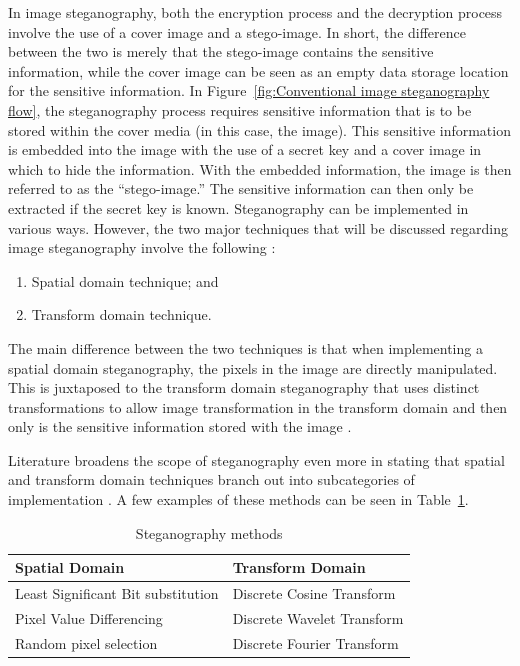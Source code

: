 In image steganography, both the encryption process and the decryption process involve the use of a cover image and a stego-image. In short, the difference between the two is merely that the stego-image contains the sensitive information, while the cover image can be seen as an empty data storage location for the sensitive information. In Figure~\ref{fig:Conventional image steganography flow}, the steganography process requires sensitive information that is to be stored within the cover media (in this case, the image). This sensitive information is embedded into the image with the use of a secret key and a cover image in which to hide the information. With the embedded information, the image is then referred to as the “stego-image.” The sensitive information can then only be extracted if the secret key is known.
\pagebreak
Steganography can be implemented in various ways. However, the two major techniques that will be discussed regarding image steganography involve the following \citep{Pradhan2016, Paul2012}:

\begin{enumerate}[label=\roman*.]
	\item Spatial domain technique; and 
	\item Transform domain technique.
\end{enumerate}

The main difference between the two techniques is that when implementing a spatial domain steganography, the pixels in the image are directly manipulated. This is juxtaposed to the transform domain steganography that uses distinct transformations to allow image transformation in the transform domain and then only is the sensitive information stored with the image \citep{Pradhan2016, Roy2016}.

Literature broadens the scope of steganography even more in stating that spatial and transform domain techniques branch out into subcategories of implementation \citep{Radha2011, SyedAhmad2012, Verma2016}. A few examples of these methods can be seen in Table~\ref{table: Steganography methods}.

\begin{table}[h]
\caption{Steganography methods}
\centering
 \begin{tabular}{|p{} | p{}|} 
 \hline
	\textbf{Spatial Domain} & \textbf{Transform Domain} \\ [1ex] 
 \hline\hline 
 Least Significant Bit substitution & Discrete Cosine Transform  \\[1ex]
 \hline 
 Pixel Value Differencing & Discrete Wavelet Transform  \\[1ex]
 \hline
 Random pixel selection & Discrete Fourier Transform  \\ [1ex] 
 \hline
 \end{tabular}
 \label{table: Steganography methods}
\end{table}


